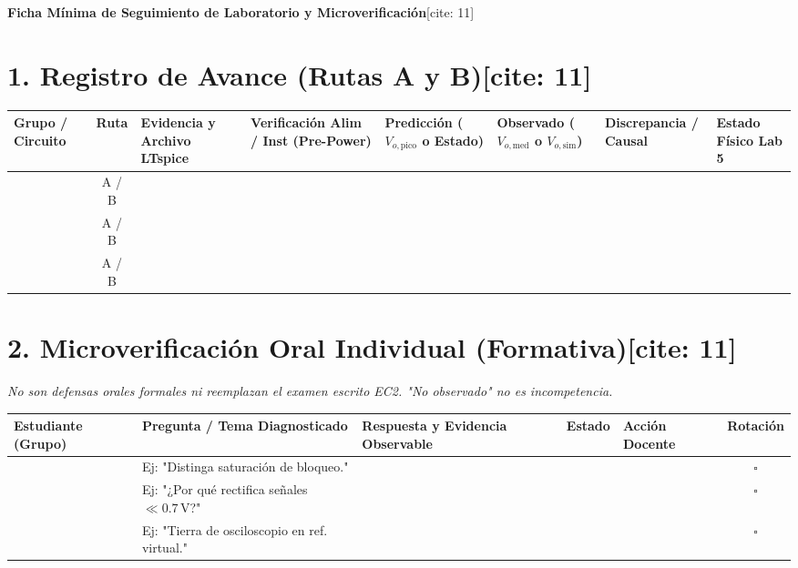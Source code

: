 \documentclass[10pt, a4paper, landscape]{article}
\begin{document}
\begin{center}
    {\Large\textbf{\textcolor{ucbblue}{Ficha Mínima de Seguimiento de Laboratorio y Microverificación}}}[cite: 11]
\end{center}

\section*{1. Registro de Avance (Rutas A y B)[cite: 11]}
\begin{table}[htbp]
    \centering
    \scriptsize
    \renewcommand{\arraystretch}{1.4}
    \begin{tabularx}{\textwidth}{|P{1.8cm}|c|P{2.2cm}|P{2.5cm}|P{2.0cm}|P{2.0cm}|P{3.5cm}|Y|}
    \hline
    \textbf{Grupo / Circuito} & \textbf{Ruta} & \textbf{Evidencia y Archivo LTspice} & \textbf{Verificación Alim / Inst (Pre-Power)} & \textbf{Predicción ($V_{o,\mathrm{pico}}$ o Estado)} & \textbf{Observado ($V_{o,\mathrm{med}}$ o $V_{o,\mathrm{sim}}$)} & \textbf{Discrepancia / Causal} & \textbf{Estado Físico Lab 5} \\ \hline
     & A / B & & & & & & \\ \hline
     & A / B & & & & & & \\ \hline
     & A / B & & & & & & \\ \hline
    \end{tabularx}
\end{table}

\section*{2. Microverificación Oral Individual (Formativa)[cite: 11]}
\textit{No son defensas orales formales ni reemplazan el examen escrito EC2. "No observado" no es incompetencia.}
\begin{table}[htbp]
    \centering
    \scriptsize
    \renewcommand{\arraystretch}{1.35}
    \begin{tabularx}{\textwidth}{|P{3.0cm}|P{4.0cm}|P{5.0cm}|c|Y|c|}
    \hline
    \textbf{Estudiante (Grupo)} & \textbf{Pregunta / Tema Diagnosticado} & \textbf{Respuesta y Evidencia Observable} & \textbf{Estado} & \textbf{Acción Docente} & \textbf{Rotación} \\ \hline
     & Ej: "Distinga saturación de bloqueo." & & & & $\square$ \\ \hline
     & Ej: "¿Por qué rectifica señales $\ll 0.7\,\text{V}$?" & & & & $\square$ \\ \hline
     & Ej: "Tierra de osciloscopio en ref. virtual." & & & & $\square$ \\ \hline
    \end{tabularx}
\end{table}
\end{document}
